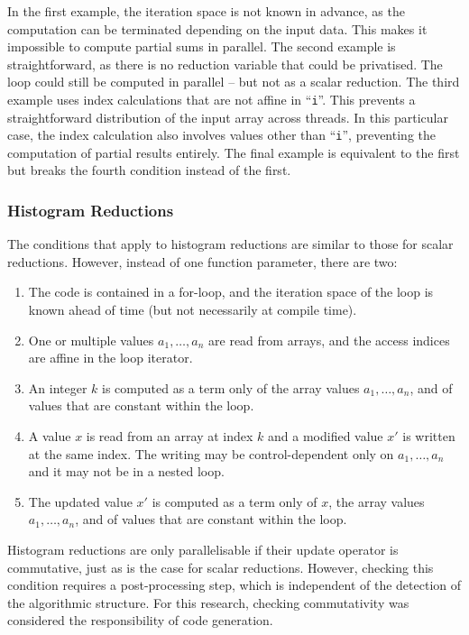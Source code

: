     In the first example, the iteration space is not known in advance, as the
    computation can be terminated depending on the input data.
    This makes it impossible to compute partial sums in parallel.
    The second example is straightforward, as there is no reduction variable
    that could be privatised.
    The loop could still be computed in parallel -- but not as a scalar
    reduction.
    The third example uses index calculations that are not affine in
    ``{\tt i}''.
    This prevents a straightforward distribution of the input array across
    threads.
    In this particular case, the index calculation also involves values other
    than ``{\tt i}'', preventing the computation of partial results entirely.
    The final example is equivalent to the first but breaks the fourth condition
    instead of the first.

\subsubsection{Histogram Reductions}
\label{section:histocond}

    The conditions that apply to histogram reductions are similar to those for
    scalar reductions.
    However, instead of one function parameter, there are two:
    \begin{enumerate}
        \item The code is contained in a for-loop, and the iteration space of
              the loop is known ahead of time
              (but not necessarily at compile time).
        \item One or multiple values $a_1,\dots,a_n$ are read from arrays, and
              the access indices are affine in the loop iterator.
        \item An integer $k$ is computed as a term only of the array values
              $a_1,\dots,a_n$, and of values that are constant within the loop.
        \item A value $x$ is read from an array at index $k$ and a
              modified value $x'$ is written at the same index.
              The writing may be control-dependent only on $a_1,\dots,a_n$ and
              it may not be in a nested loop.
        \item The updated value $x'$ is computed as a term only of $x$, the
              array values $a_1,\dots,a_n$, and of values that are constant
              within the loop.
    \end{enumerate}

    Histogram reductions are only parallelisable if their update operator is
    commutative, just as is the case for scalar reductions.
    However, checking this condition requires a post-processing step,
    which is independent of the detection of the algorithmic structure.
    For this research, checking commutativity was considered the responsibility
    of code generation.

